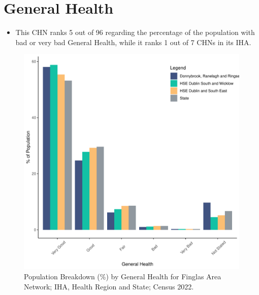 \documentclass{article}
\begin{document}
\pagebreak

\section{General Health}\label{sect:GenHealth}
\begin{itemize}
\item  This CHN ranks  5 out of 96 regarding the percentage of the population with bad or very bad General Health, while it ranks   1 out of 7 CHNs in its IHA.
\end{itemize}
\begin{figure}[h]
	\centering
	\includegraphics[width = 150mm]{../figures/GenED.pdf}
	\caption{Population Breakdown (\%) by General Health for Finglas Area Network; IHA, Health Region and State;  Census 2022.}
	\label{fig:2ae19629-1a6a-13a3-e055-000000000001}
	\end{figure}
\end{document}
